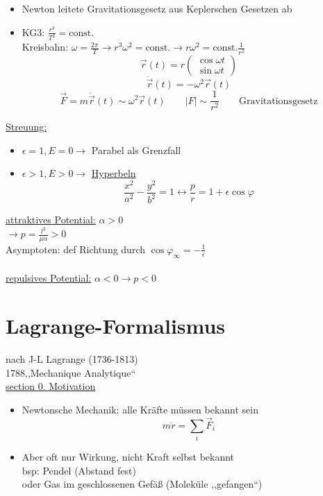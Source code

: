 \documentclass[titlepage,12pt,a4paper,ngerman]{report}
\newcommand{\tx}[1]{\textrm{#1}}
\begin{document}
{\begin{itemize}
	\item Newton leitete Gravitationsgesetz aus Keplerschen Gesetzen ab
	\item  KG3: $ \frac{r^3}{T^2} = \tx{const.} $\\
	Kreisbahn: $ \omega = \frac{2\pi}{T}  \rightarrow r^3 \omega^2 = \tx{const.} \rightarrow r \omega^2 = \tx{const.} \frac{1}{r^2}$
	$$\vec{r}(t) = r \begin{pmatrix}
	\cos \omega t \\
	\sin \omega t
	\end{pmatrix}$$
	$$\ddot{\vec{r}} (t) = - \omega^2 \vec{r}(t)$$
	$$\vec{F} = m \ddot{\vec{r}} (t) \sim \omega^2 \vec{r}(t) \qquad |F| \sim \frac{1}{r^2} \qquad \tx{Gravitationsgesetz}$$
\end{itemize}

\underline{Streuung:}
\begin{itemize}
	\item $ \epsilon = 1, E = 0 \rightarrow $ Parabel als Grenzfall
	\item $ \epsilon > 1, E > 0 \rightarrow $ \underline{Hyperbeln}
	$$\frac{x^2}{a^2} - \frac{y^2}{b^2} = 1 \leftrightarrow \frac{p}{r} = 1 + \epsilon \cos \varphi$$
\end{itemize}
\underline{attraktives Potential:} $ \alpha > 0 $\\
$ \rightarrow p = \frac{l^2}{\mu \alpha} > 0 $\\
Asymptoten: def Richtung durch $ \cos \varphi_\infty = -\frac{1}{\epsilon} $\\\\
\underline{repulsives Potential:} $ \alpha < 0 \rightarrow p < 0 $\\


\chapter{Lagrange-Formalismus}
nach J-L Lagrange (1736-1813)\\
1788,,Mechanique Analytique``\\
\underline{\underline{section 0. Motivation}}
\begin{itemize}
	\item Newtonsche Mechanik: alle Kräfte müssen bekannt sein
	$$ m\ddot{r} = \sum_i \vec{F}_i$$
	\item Aber oft nur Wirkung, nicht Kraft selbst bekannt\\
	bsp: Pendel (Abstand fest) \\
	oder Gas im geschlossenen Gefäß (Moleküle ,,gefangen``)
\end{itemize}
}
\end{document}
